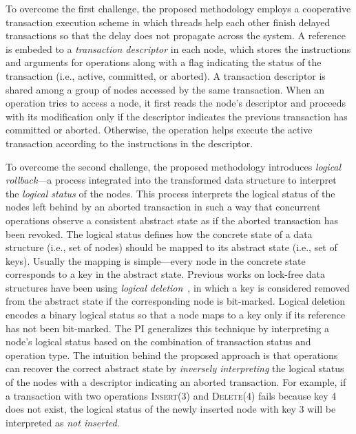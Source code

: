 To overcome the first challenge, the proposed methodology employs a cooperative transaction execution scheme in which threads help each other finish delayed transactions so that the delay does not propagate across the system.
A reference is embeded to a \emph{transaction descriptor} in each node, which stores the instructions and arguments for operations along with a flag indicating the status of the transaction (i.e., active, committed, or aborted).
A transaction descriptor is shared among a group of nodes accessed by the same transaction. 
When an operation tries to access a node, it first reads the node's descriptor and proceeds with its modification only if the descriptor indicates the previous transaction has committed or aborted. 
Otherwise, the operation helps execute the active transaction according to the instructions in the descriptor.

To overcome the second challenge, the proposed methodology introduces \emph{logical rollback}---a process integrated into the transformed data structure to interpret the \emph{logical status} of the nodes.
This process interprets the logical status of the nodes left behind by an aborted transaction in such a way that concurrent operations observe a consistent abstract state as if the aborted transaction has been revoked.
The logical status defines how the concrete state of a data structure (i.e., set of nodes) should be mapped to its abstract state (i.e., set of keys).
Usually the mapping is simple---every node in the concrete state corresponds to a key in the abstract state.
Previous works on lock-free data structures have been using \emph{logical deletion}~\cite{harris2001pragmatic}, in which a key is considered removed from the abstract state if the corresponding node is bit-marked.
Logical deletion encodes a binary logical status so that a node maps to a key only if its reference has not been bit-marked.
The PI generalizes this technique by interpreting a node's logical status based on the combination of transaction status and operation type.
The intuition behind the proposed approach is that operations can recover the correct abstract state by \emph{inversely interpreting} the logical status of the nodes with a descriptor indicating an aborted transaction.
For example, if a transaction with two operations \textsc{Insert(3)} and \textsc{Delete(4)} fails because key 4 does not exist, the logical status of the newly inserted node with key 3 will be interpreted as \emph{not inserted}.

